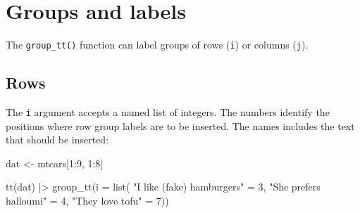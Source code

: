 \documentclass[
  letterpaper,
  DIV=11,
  numbers=noendperiod]{scrartcl}
\newenvironment{Shaded}{\begin{snugshade}}{\end{snugshade}}
\newcommand{\AttributeTok}[1]{\textcolor[rgb]{0.40,0.45,0.13}{#1}}
\newcommand{\DecValTok}[1]{\textcolor[rgb]{0.68,0.00,0.00}{#1}}
\newcommand{\FunctionTok}[1]{\textcolor[rgb]{0.28,0.35,0.67}{#1}}
\newcommand{\NormalTok}[1]{\textcolor[rgb]{0.00,0.23,0.31}{#1}}
\newcommand{\OtherTok}[1]{\textcolor[rgb]{0.00,0.23,0.31}{#1}}
\newcommand{\SpecialCharTok}[1]{\textcolor[rgb]{0.37,0.37,0.37}{#1}}
\newcommand{\StringTok}[1]{\textcolor[rgb]{0.13,0.47,0.30}{#1}}
\begin{document}
\section{Groups and labels}\label{groups-and-labels}

The \texttt{group\_tt()} function can label groups of rows (\texttt{i})
or columns (\texttt{j}).

\subsection{Rows}\label{rows}

The \texttt{i} argument accepts a named list of integers. The numbers
identify the positions where row group labels are to be inserted. The
names includes the text that should be inserted:

\begin{Shaded}
\begin{Highlighting}[]
\NormalTok{dat }\OtherTok{\textless{}{-}}\NormalTok{ mtcars[}\DecValTok{1}\SpecialCharTok{:}\DecValTok{9}\NormalTok{, }\DecValTok{1}\SpecialCharTok{:}\DecValTok{8}\NormalTok{]}

\FunctionTok{tt}\NormalTok{(dat) }\SpecialCharTok{|\textgreater{}}
  \FunctionTok{group\_tt}\NormalTok{(}\AttributeTok{i =} \FunctionTok{list}\NormalTok{(}
    \StringTok{"I like (fake) hamburgers"} \OtherTok{=} \DecValTok{3}\NormalTok{,}
    \StringTok{"She prefers halloumi"} \OtherTok{=} \DecValTok{4}\NormalTok{,}
    \StringTok{"They love tofu"} \OtherTok{=} \DecValTok{7}\NormalTok{))}
\end{Highlighting}
\end{Shaded}
\end{document}
